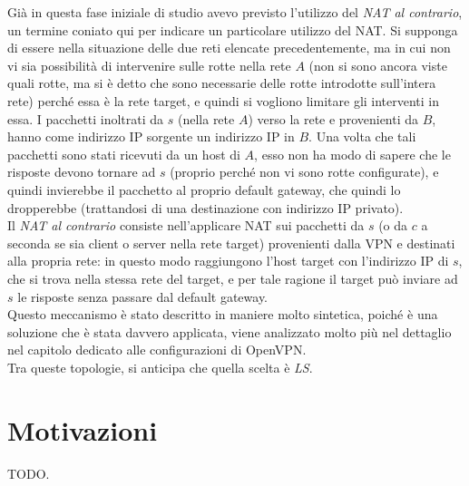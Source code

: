 Già in questa fase iniziale di studio avevo previsto l'utilizzo del \textit{NAT al contrario},
un termine coniato qui per indicare un particolare utilizzo del NAT. Si supponga di
essere nella situazione delle due reti elencate precedentemente, ma in cui non vi sia
possibilità di intervenire sulle rotte nella rete $A$ (non si sono ancora viste quali rotte,
ma si è detto che sono necessarie delle rotte introdotte sull'intera rete) perché essa è
la rete target, e quindi si vogliono limitare gli interventi in essa.
I pacchetti inoltrati da $s$ (nella rete $A$) verso la rete e provenienti da $B$, hanno
come indirizzo IP sorgente un indirizzo IP in $B$. Una volta che tali pacchetti
sono stati ricevuti da un host di $A$, esso non ha modo di sapere che le risposte devono
tornare ad $s$ (proprio perché non vi sono rotte configurate), e quindi invierebbe il
pacchetto al proprio default gateway, che quindi lo dropperebbe (trattandosi di una
destinazione con indirizzo IP privato).\\
Il \textit{NAT al contrario} consiste nell'applicare NAT sui pacchetti
da $s$ (o da $c$ a seconda se sia client o server nella rete target) provenienti dalla
VPN e destinati alla propria rete: in questo modo raggiungono l'host target con l'indirizzo IP
di $s$, che si trova nella stessa rete del target, e per tale ragione il target può
inviare ad $s$ le risposte senza passare dal default gateway.\\
Questo meccanismo è stato descritto in maniere molto sintetica, poiché è una soluzione che è stata
davvero applicata, viene analizzato molto più nel dettaglio nel capitolo dedicato alle configurazioni
di OpenVPN.\\
Tra queste topologie, si anticipa che quella scelta è \textit{LS}.


\section{Motivazioni}
TODO.

